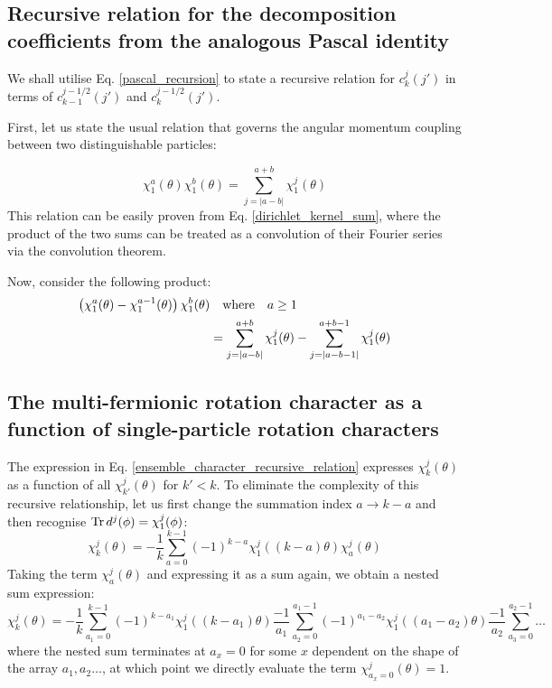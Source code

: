 \documentclass[12pt]{article}
\begin{document}
	\subsection{Recursive relation for the decomposition coefficients from the analogous Pascal identity}
	We shall utilise Eq. \ref{pascal_recursion} to state a recursive relation for $c^j_k(j')$ in terms of $c^{j-1/2}_{k-1}(j')$ and $c^{j-1/2}_{k}(j')$.
	
	First, let us state the usual relation that governs the angular momentum coupling between two distinguishable particles:
	
	\begin{equation} \label{distinguishable_particle_coupling_decomposition}
	\chi^a_1(\theta)\chi^b_1(\theta)=\sum_{j=|a-b|}^{a+b} \chi^j_1(\theta)
	\end{equation}
	This relation can be easily proven from Eq. \ref{dirichlet_kernel_sum}, where the product of the two sums can be treated as a convolution of their Fourier series via the convolution theorem.
	
	Now, consider the following product:
	\begin{align}
	\left(\chi^a_1(\theta)-\chi^{a-1}_1(\theta)\right)\chi^b_1(\theta)&\qq{where}a\geq 1\nonumber\\
	&= \sum_{j=|a-b|}^{a+b}\chi^j_1(\theta)-\sum_{j=|a-b-1|}^{a+b-1}\chi^j_1(\theta)
	\end{align}
	
	\subsection{The multi-fermionic rotation character as a function of single-particle rotation characters}
	The expression in Eq. \ref{ensemble_character_recursive_relation} expresses $\chi^j_k(\theta)$ as a function of all $\chi^j_{k'}(\theta)$ for $k'<k$. To eliminate the complexity of this recursive relationship, let us first change the summation index $a\rightarrow k-a$ and then recognise $\Tr d^j(\phi)=\chi^j_1(\phi)$:
	\begin{equation}
	\chi^j_k(\theta)=-\frac{1}{k}\sum_{a=0}^{k-1} (-1)^{k-a}\chi^j_1((k-a)\theta)\chi^j_{a}(\theta)
	\end{equation}
	Taking the term $\chi^j_{a}(\theta)$ and expressing it as a sum again, we obtain a nested sum expression:
	\begin{equation} \label{nested_sum_a}
	\chi^j_k(\theta)=-\frac{1}{k}\sum_{a_1=0}^{k-1} (-1)^{k-a_1}\chi^j_1((k-a_1)\theta)\frac{-1}{a_1}\sum_{a_2=0}^{a_1-1} (-1)^{a_1-a_2}\chi^j_1((a_1-a_2)\theta)\frac{-1}{a_2}\sum_{a_3=0}^{a_2-1}\dots
	\end{equation}
	where the nested sum terminates at $a_x=0$ for some $x$ dependent on the shape of the array $a_1, a_2\dots$, at which point we directly evaluate the term $\chi^j_{a_x=0}(\theta)=1$.
	
\end{document}
